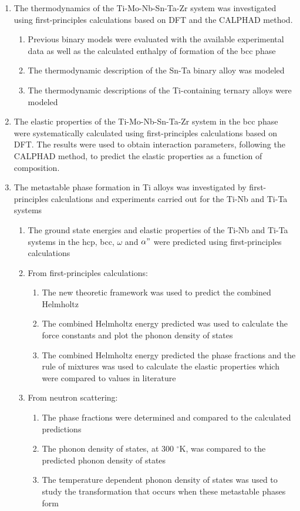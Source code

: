 \begin{enumerate}
	\item The thermodynamics of the Ti-Mo-Nb-Sn-Ta-Zr system was investigated using first-principles calculations based on DFT and the CALPHAD method. 
	\begin{enumerate}
		\item Previous binary models were evaluated with the available experimental data as well as the calculated enthalpy of formation of the bcc phase 
		\item The thermodynamic description of the Sn-Ta binary alloy was modeled
		\item The thermodynamic descriptions of the Ti-containing ternary alloys were modeled
	\end{enumerate}
	\item The elastic properties of the Ti-Mo-Nb-Sn-Ta-Zr system in the bcc phase were systematically calculated using first-principles calculations based on DFT. The results were used to obtain interaction parameters, following the CALPHAD method, to predict the elastic properties as a function of composition. 
	\item The metastable phase formation in Ti alloys was investigated by first-principles calculations and experiments carried out for the Ti-Nb and Ti-Ta systems
	\begin{enumerate}
		\item The ground state energies and elastic properties of the Ti-Nb and Ti-Ta systems in the hcp, bcc, $\omega$ and $\alpha"$ were predicted using first-principles calculations
		\item From first-principles calculations:
			\begin{enumerate}
			\item The new theoretic framework was used to predict the combined Helmholtz
			\item The combined Helmholtz energy predicted was used to calculate the force constants and plot the phonon density of states
			\item The combined Helmholtz energy predicted the phase fractions and the rule of mixtures was used to calculate the elastic properties which were compared to values in literature
		\end{enumerate}
		\item From neutron scattering:
		\begin{enumerate}
			\item The phase fractions were determined and compared to the calculated predictions
			\item The phonon density of states, at 300 $^\circ$K, was compared to the predicted phonon density of states 
			\item The temperature dependent phonon density of states was used to study the transformation that occurs when these metastable phases form
		\end{enumerate}
	\end{enumerate} 
\end{enumerate}

